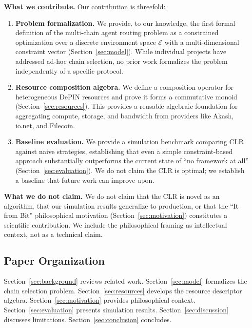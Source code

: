 \documentclass[conference, 10pt, twocolumn]{IEEEtran}
\begin{document}
\textbf{What we contribute.}  Our contribution is threefold:

\begin{enumerate}[leftmargin=*]
  \item \textbf{Problem formalization.}  We provide, to our knowledge,
    the first formal definition of the multi-chain agent routing problem
    as a constrained optimization over a discrete environment space
    $\mathcal{E}$ with a multi-dimensional constraint vector
    (Section~\ref{sec:model}).  While individual projects have addressed
    ad-hoc chain selection, no prior work formalizes the problem
    independently of a specific protocol.

  \item \textbf{Resource composition algebra.}  We define a composition
    operator for heterogeneous DePIN resources and prove it forms a
    commutative monoid (Section~\ref{sec:resources}).  This provides a
    reusable algebraic foundation for aggregating compute, storage, and
    bandwidth from providers like Akash, io.net, and Filecoin.

  \item \textbf{Baseline evaluation.}  We provide a simulation
    benchmark comparing CLR against naive strategies, establishing that
    even a simple constraint-based approach substantially outperforms
    the current state of ``no framework at all''
    (Section~\ref{sec:evaluation}).  We do not claim the CLR is optimal;
    we establish a baseline that future work can improve upon.
\end{enumerate}

\textbf{What we do not claim.}  We do not claim that the CLR is
novel as an algorithm, that our simulation results generalize to
production, or that the ``It from Bit'' philosophical motivation
(Section~\ref{sec:motivation}) constitutes a scientific contribution.
We include the philosophical framing as intellectual context, not as
a technical claim.

\subsection{Paper Organization}

Section~\ref{sec:background} reviews related work.
Section~\ref{sec:model} formalizes the chain selection problem.
Section~\ref{sec:resources} develops the resource descriptor algebra.
Section~\ref{sec:motivation} provides philosophical
context.  Section~\ref{sec:evaluation} presents simulation results.
Section~\ref{sec:discussion} discusses limitations.
Section~\ref{sec:conclusion} concludes.
\end{document}
